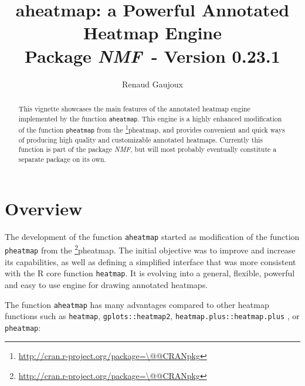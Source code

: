 \documentclass[a4paper]{article}\usepackage[]{graphicx}\usepackage[]{color}
\makeatletter
\let\code=\texttt
\newcommand{\pkgname}[1]{\textit{#1}\xspace}
\newcommand{\CRANurl}[1]{\url{http://cran.r-project.org/package=#1}}
\def\CRANpkg{\@ifstar\@CRANpkg\@@CRANpkg}
\def\@CRANpkg#1{\href{http://cran.r-project.org/package=#1}{\pkgname{#1}}\footnote{\CRANurl{#1}}}
\def\@@CRANpkg#1{\href{http://cran.r-project.org/package=#1}{\pkgname{#1}} package\footnote{\CRANurl{#1}}}
\newcommand{\nmfpack}{\pkgname{NMF}}
\makeatother
\begin{document}
\title{aheatmap: a Powerful Annotated Heatmap Engine\\
\small Package \nmfpack\ - Version 0.23.1}
\author{Renaud Gaujoux}

\maketitle

\begin{abstract}
This vignette showcases the main features of the annotated heatmap engine
implemented by the function \code{aheatmap}.
This engine is a highly enhanced modification of the function \code{pheatmap}
from the \CRANpkg{pheatmap}, and provides convenient and quick ways of producing high quality and customizable annotated heatmaps.
Currently this function is part of the package \nmfpack, but will most
probably eventually constitute a separate package on its own.
\end{abstract}

{\small \tableofcontents}

\section{Overview}

The development of the function \code{aheatmap} started as modification of the
function \code{pheatmap} from the \CRANpkg{pheatmap}. 
The initial objective was to improve and increase its capabilities, as well as 
defining a simplified interface that was more consistent with the R core
function \code{heatmap}.
It is evolving into a general, flexible, powerful and easy to use engine for
drawing annotated heatmaps.
  
The function \code{aheatmap} has many advantages compared to other heatmap functions 
such as \code{heatmap}, \code{gplots::heatmap2}, \code{heatmap.plus::heatmap.plus} 
, or \code{pheatmap}:
\end{document}
